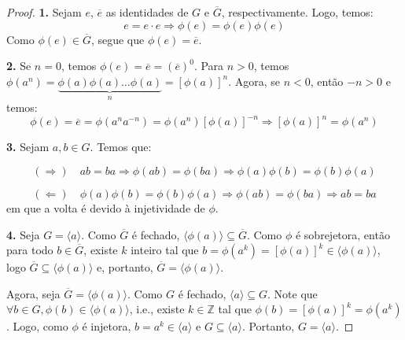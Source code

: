 \documentclass[a4paper,portuguese,11pt,twoside, leqno]{book}
\theoremstyle{definition}
\begin{document}
	\begin{proof}
		\textbf{1.} Sejam $e$, $\overline{e}$ as identidades de $G$ e $\overline{G}$, respectivamente. Logo, temos:
		\begin{equation*}
		e = e\cdot e \Rightarrow \phi (e) = \phi (e)\phi (e)
		\end{equation*} 
		Como $\phi (e)\in \overline{G}$, segue que $\phi(e) = \overline{e}$. 
		\par\vspace{0.4cm}
		\textbf{2.} Se $n=0$, temos $\phi (e) = \overline{e} = (\overline{e})^0$. 
		Para $n>0$, temos $\phi (a^n) = \underbrace{\phi (a)\phi (a)\dots \phi (a)}_{n} = [\phi (a)]^n$.
		Agora, se $n<0$, então $-n>0$ e temos:
		\begin{equation*}
		\phi (e) = \overline{e} = \phi (a^n a^{-n}) = \phi (a^n)[\phi (a)]^{-n} \Rightarrow [\phi (a)]^n = \phi (a^n)
		\end{equation*}
		\par\vspace{0.4cm}
		\textbf{3.} Sejam $a,b \in G$. Temos que:
		\par
		\begin{equation*}
		(\Rightarrow) \hspace{12pt}ab = ba \Rightarrow \phi (ab) = \phi (ba) \Rightarrow \phi (a)\phi (b) = \phi (b)\phi (a)
		\end{equation*}
		\par
		\begin{equation*}
		(\Leftarrow)\hspace{12pt}\phi(a)\phi(b) = \phi(b)\phi(a) \Rightarrow \phi(ab) = \phi(ba) \Rightarrow ab = ba
		\end{equation*}
		em que a volta é devido à injetividade de $\phi$.
		\par\vspace{0.4cm}
		\textbf{4.} Seja $G = \langle a \rangle $. Como $\overline{G}$ é fechado, $\langle \phi(a)\rangle \subseteq \overline{G}$. Como $\phi$ é sobrejetora, então para todo $b\in\overline{G}$, existe $k$ inteiro tal que $b = \phi(a^k) = [\phi(a)]^k \in\langle \phi(a)\rangle $, logo $\overline{G}\subseteq\langle \phi(a)\rangle$ e, portanto, $\overline{G} = \langle \phi(a)\rangle.$
		\par\vspace{0.3cm} Agora, seja $\overline{G} = \langle \phi(a)\rangle$. Como $G$ é fechado, $\langle a\rangle \subseteq G$. Note que $\forall b\in G, \phi(b)\in\langle \phi(a)\rangle$, i.e., existe $k\in\mathbb{Z}$ tal que $\phi(b) = [\phi(a)]^k = \phi(a^k)$. Logo, como $\phi$ é injetora, $b = a^k\in\langle a\rangle $ e $G \subseteq \langle a\rangle$. Portanto, $G = \langle a\rangle$. 

\end{proof}
\end{document}
